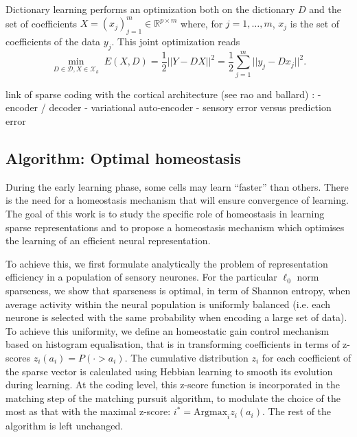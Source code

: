\documentclass[a4paper, 11pt, draft]{article} %
\newcommand{\umin}[1]{\underset{#1}{\min}\;}
\newcommand{\norm}[1]{|\!| #1 |\!|}
\newcommand{\Xx}{\mathcal{X}}
\newcommand{\RR}{\mathbb{R}}
\newcommand{\Dd}{\mathcal{D}}
\begin{document}
Dictionary learning performs an optimization both on the dictionary $D$
and the set of coefficients $ X = (x_j)_{j=1}^m \in \RR^{p \times m} $
where, for $j=1,\ldots,m$, $ x_j $
is the set of coefficients of the data $y_j$. This joint optimization reads
$$ \umin{ D \in \Dd, X \in \Xx_k } E(X,D) = \frac{1}{2}\norm{Y-DX}^2 =
\frac{1}{2} \sum_{j=1}^m \norm{y_j - D x_j}^2. $$


link of sparse coding with the cortical architecture (see rao and ballard) : 
- encoder / decoder
- variational auto-encoder
- sensory error versus prediction error

\subsection{Algorithm: Optimal homeostasis}\label{HEH}

During the early learning phase, some cells may learn ``faster'' than others. There is the need for a homeostasis mechanism that will ensure convergence of learning. The goal of this work is to study the specific role of homeostasis in learning sparse representations and to propose a homeostasis mechanism which optimises the learning of an efficient neural representation. 

To achieve this, we first formulate analytically the problem of representation efficiency in a population of sensory neurones. For the particular $\ell_0$ norm sparseness, we show that sparseness is optimal, in term of Shannon entropy, when average activity within the neural population is uniformly balanced (i.e. each neurone is selected with the same probability when encoding a large set of data). To achieve this uniformity, we define an homeostatic gain control mechanism based on histogram equalisation, that is in transforming coefficients in terms of z-scores $z_i(a_i) = P( \cdot > a_i)$. The cumulative distribution $z_i$ for each coefficient of the sparse vector is calculated using Hebbian learning to smooth its evolution during learning. At the coding level, this z-score function is incorporated in the matching step of the matching pursuit algorithm, to modulate the choice of the most  as that with the maximal z-score: $i^\ast = \mathrm{Argmax}_i z_i(a_i)$. The rest of the algorithm is left unchanged.
\end{document}
